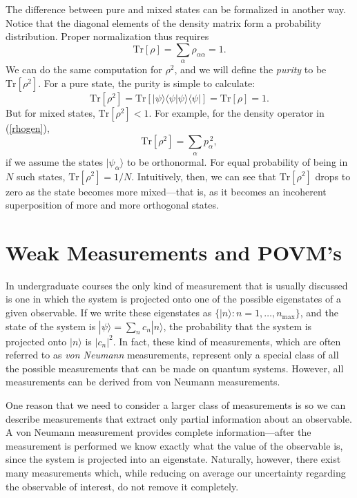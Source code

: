 \documentclass[aps,twocolumn,superscriptaddress,footinbib,floatfix,showpacs]{revtex4}
\def\ket#1{|{#1}\rangle}
\def\bra#1{\langle{#1}|}
\begin{document}
The difference between pure and mixed states can be formalized in
another way.  Notice that the diagonal elements of the density matrix
form a probability distribution.  Proper normalization thus requires
\begin{equation}
  \mathrm{Tr}[\rho] = \sum_\alpha \rho_{\alpha\alpha} = 1.
\end{equation}
We can do the same computation for $\rho^2$, and we will
define the \textit{purity} to be $\mathrm{Tr}[\rho^2]$.
For a pure state,
the purity is simple to calculate:
\begin{equation}
  \mathrm{Tr}[\rho^2] = \mathrm{Tr}[\ket\psi\langle\psi|\psi\rangle\bra\psi]
  = \mathrm{Tr}[\rho] = 1.
\end{equation}
But for mixed states, $\mathrm{Tr}[\rho^2] < 1$.  For example, 
for the density operator in (\ref{rhogen}),
\begin{equation}
  \mathrm{Tr}[\rho^2] = \sum_\alpha p_\alpha^{\,2},
\end{equation}
if we assume the states $\ket{\psi_\alpha}$ to be orthonormal.
For equal probability of being in $N$ such states, 
$\mathrm{Tr}[\rho^2]=1/N$.  Intuitively, then, we can see
that $\mathrm{Tr}[\rho^2]$ drops to zero as the state becomes
more mixed---that is, as it becomes an incoherent superposition
of more and more orthogonal states.


\section{Weak Measurements and POVM's}
\label{section:weak}

In undergraduate courses the only kind of measurement that is
usually discussed is one in which the system is projected onto one
of the possible eigenstates of a given observable. If we write
these eigenstates as $\{|n\rangle :
n=1,\ldots,n_\mathrm{max}\}$, 
and the state of the
system is $|\psi\rangle = \sum_n c_n |n\rangle$, the probability
that the system is projected onto $|n\rangle$ is $|c_n|^2$. In
fact, these kind of measurements, which are often referred to as
{\em von Neumann} measurements, represent only a special class of
all the possible measurements that can be made on quantum
systems. However, all measurements can be derived from von Neumann
measurements.

One reason that we need to consider a larger class of measurements
is so we can describe measurements that extract only partial
information about an observable. A von Neumann measurement
provides complete information---after the measurement is
performed we know exactly what the value of the observable is,
since the system is projected into an eigenstate. Naturally,
however, there exist many measurements which, while reducing on
average our uncertainty regarding the observable of interest, do
not remove it completely.
\end{document}
